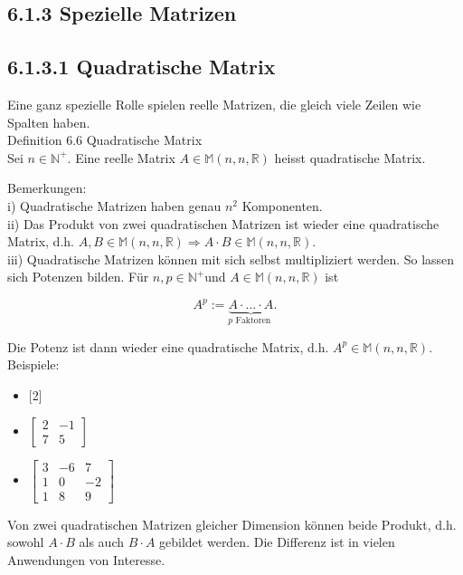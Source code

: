 \documentclass[10pt]{article}
\begin{document}
\subsection*{6.1.3 Spezielle Matrizen}
\subsection*{6.1.3.1 Quadratische Matrix}
Eine ganz spezielle Rolle spielen reelle Matrizen, die gleich viele Zeilen wie Spalten haben.\\
Definition 6.6 Quadratische Matrix\\
Sei $n \in \mathbb{N}^{+}$. Eine reelle Matrix $A \in \mathbb{M}(n, n, \mathbb{R})$ heisst quadratische Matrix.

Bemerkungen:\\
i) Quadratische Matrizen haben genau $n^{2}$ Komponenten.\\
ii) Das Produkt von zwei quadratischen Matrizen ist wieder eine quadratische Matrix, d.h. $A, B \in \mathbb{M}(n, n, \mathbb{R}) \Rightarrow A \cdot B \in \mathbb{M}(n, n, \mathbb{R})$.\\
iii) Quadratische Matrizen können mit sich selbst multipliziert werden. So lassen sich Potenzen bilden. Für $n, p \in \mathbb{N}^{+}$und $A \in \mathbb{M}(n, n, \mathbb{R})$ ist


\begin{equation*}
A^{p}:=\underbrace{A \cdot \ldots \cdot A}_{p \text { Faktoren }} . \tag{6.12}
\end{equation*}


Die Potenz ist dann wieder eine quadratische Matrix, d.h. $A^{p} \in \mathbb{M}(n, n, \mathbb{R})$.\\
Beispiele:

\begin{itemize}
  \item \hspace{0pt} [2]
  \item $\left[\begin{array}{rr}2 & -1 \\ 7 & 5\end{array}\right]$
  \item $\left[\begin{array}{rrr}3 & -6 & 7 \\ 1 & 0 & -2 \\ 1 & 8 & 9\end{array}\right]$
\end{itemize}

Von zwei quadratischen Matrizen gleicher Dimension können beide Produkt, d.h. sowohl $A \cdot B$ als auch $B \cdot A$ gebildet werden. Die Differenz ist in vielen Anwendungen von Interesse.
\end{document}
